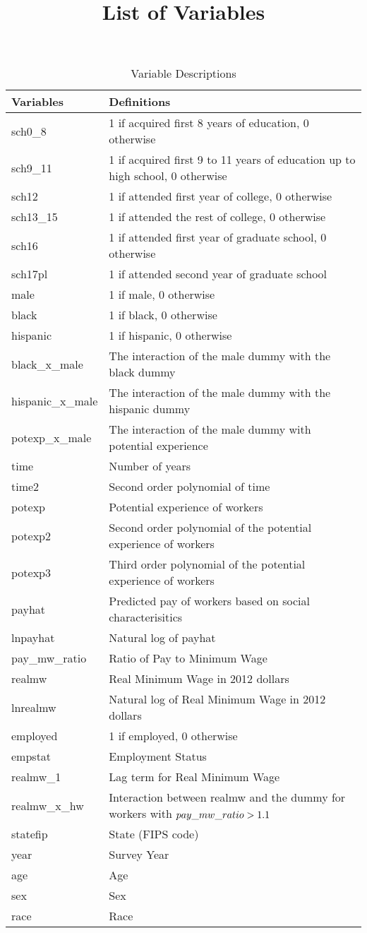 \documentclass{article}
\title{List of Variables}
\date{}
\begin{document}
\begin{table}[ht]
\centering
\caption{Variable Descriptions}
\label{my-label}
\begin{tabular}{ll}
	\hline
	Variables & Definitions \\
	\hline
    sch0\_8 & 1 if acquired first 8 years of education, 0 otherwise \\
	sch9\_11 & 1 if acquired first  9 to 11 years of education up to high school, 0 otherwise\\
	sch12 & 1 if attended first year of college, 0 otherwise\\
    sch13\_15 &  1 if attended the rest of college, 0 otherwise\\
    sch16 & 1 if attended first year of graduate school, 0 otherwise\\
   	sch17pl & 1 if attended second year of graduate school\\
   	male & 1 if male, 0 otherwise\\
   	black & 1 if black, 0 otherwise\\
   	hispanic & 1 if hispanic, 0 otherwise\\
   	black\_x\_male & The interaction of the male dummy with the black dummy\\
    hispanic\_x\_male & The interaction of the male dummy with the hispanic dummy\\
   	potexp\_x\_male &The interaction of the male dummy with potential experience \\ 
    time & Number of years \\
   	time2 &Second order polynomial of time  \\
    potexp & Potential experience of workers\\
    potexp2 &Second order polynomial of the potential experience of workers\\
    potexp3 &Third order polynomial of the potential experience of workers \\
    payhat &Predicted pay of workers based on social characterisitics\\
    lnpayhat & Natural log of payhat \\
    pay\_mw\_ratio & Ratio of Pay to Minimum Wage \\
    realmw & Real Minimum Wage in 2012 dollars \\
    lnrealmw & Natural log of Real Minimum Wage in 2012 dollars \\
    employed &1 if employed, 0 otherwise \\
    empstat &Employment Status \\
    realmw\_1 & Lag term for Real Minimum Wage  \\
    realmw\_x\_hw & Interaction between realmw and the dummy for workers with $pay {\char`_} mw {\char`_} ratio > 1.1$\\
    statefip & State (FIPS code) \\
    year & Survey Year \\
    age & Age \\
    sex & Sex \\
    race & Race \\
    \hline 
\end{tabular}
\end{table}
\end{document}
